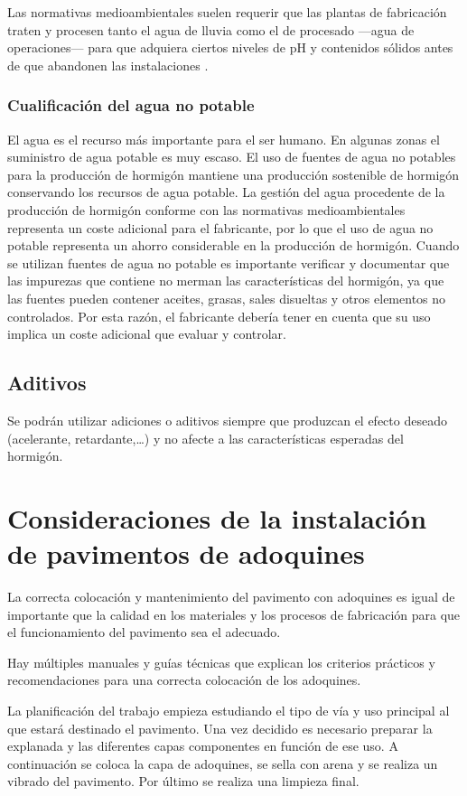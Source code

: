 Las normativas medioambientales suelen requerir que las plantas de fabricación traten y procesen tanto el agua de lluvia como el de procesado —agua de operaciones— para que adquiera ciertos niveles de pH y contenidos sólidos antes de que abandonen las instalaciones \cite{ermco}.

\subsubsection{Cualificación del agua no potable}
El agua es el recurso más importante para el ser humano. En algunas zonas el suministro de agua potable es muy escaso. El uso de fuentes de agua no potables para la producción de hormigón mantiene una producción sostenible de hormigón conservando los recursos de agua potable. La gestión del agua procedente de la producción de hormigón conforme con las normativas medioambientales representa un coste adicional para el fabricante, por lo que el uso de agua no potable representa un ahorro considerable en la producción de hormigón. Cuando se utilizan fuentes de agua no potable es importante verificar y documentar que las impurezas que contiene no merman las características del hormigón, ya que las fuentes pueden contener aceites, grasas, sales disueltas y otros elementos no controlados. Por esta razón, el fabricante debería tener en cuenta que su uso implica un coste adicional que evaluar y controlar.

\subsection{Aditivos}
Se podrán utilizar adiciones o aditivos siempre que produzcan el efecto deseado (acelerante, retardante,\ldots) y no afecte a las características esperadas del hormigón.

\section{Consideraciones de la instalación de pavimentos de adoquines}
La correcta colocación y mantenimiento del pavimento con adoquines es igual de importante que la calidad en los materiales y los procesos de fabricación \cite{euroadoquinc} para que el funcionamiento del pavimento sea el adecuado.

Hay múltiples manuales y guías técnicas que explican los criterios prácticos y recomendaciones para una correcta colocación de los adoquines.

La planificación del trabajo empieza estudiando el tipo de vía y uso principal al que estará destinado el pavimento. Una vez decidido es necesario preparar la explanada y las diferentes capas componentes en función de ese uso. A continuación se coloca la capa de adoquines, se sella con arena y se realiza un vibrado del pavimento. Por último se realiza una limpieza final.

